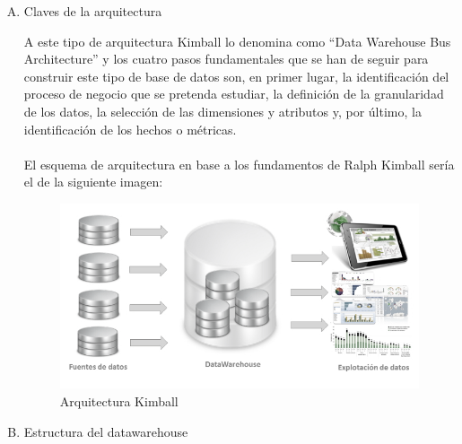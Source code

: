 \documentclass[11pt,a4paper]{article}
\begin{document}
		\begin{enumerate}[A.]
			
			\item Claves de la arquitectura
			
			A este tipo de arquitectura Kimball lo denomina como “Data Warehouse Bus Architecture” y los cuatro pasos fundamentales que se han de seguir para construir este tipo de base de datos son, en primer lugar, la identificación del proceso de negocio que se pretenda estudiar, la definición de la granularidad de los datos, la selección de las dimensiones y atributos y, por último, la identificación de los hechos o métricas.\\
			\\
			El esquema de arquitectura en base a los fundamentos de Ralph Kimball sería el de la siguiente imagen:
			
			\begin{figure}[!ht]
				\begin{center}
					\includegraphics[scale=2.0]{./Imagenes/img06}	
					\caption{Arquitectura Kimball}		
				\end{center}
			\end{figure}
		
			\item Estructura del datawarehouse
			

\end{enumerate}
\end{document}
